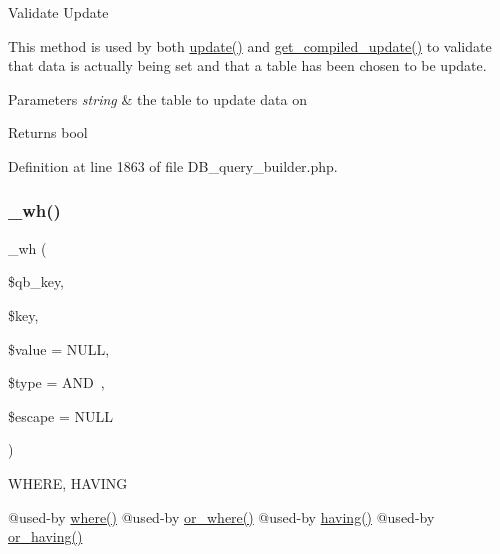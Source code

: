Validate Update

This method is used by both \mbox{\hyperlink{class_c_i___d_b__query__builder_a130a26da2dd4e4582ee18f42d71fe6e4}{update()}} and \mbox{\hyperlink{class_c_i___d_b__query__builder_a77fb150224714405067df7c300c317b0}{get\+\_\+compiled\+\_\+update()}} to validate that data is actually being set and that a table has been chosen to be update.


\begin{DoxyParams}{Parameters}
{\em string} & the table to update data on \\
\hline
\end{DoxyParams}
\begin{DoxyReturn}{Returns}
bool 
\end{DoxyReturn}


Definition at line 1863 of file D\+B\+\_\+query\+\_\+builder.\+php.

\mbox{\label{class_c_i___d_b__query__builder_a616af9ae6c40b3fe7074a8517207934f}} 
\subsubsection{\texorpdfstring{\_wh()}{\_wh()}}
{\footnotesize\ttfamily \+\_\+wh (\begin{DoxyParamCaption}\item[{}]{\$qb\+\_\+key,  }\item[{}]{\$key,  }\item[{}]{\$value = {\ttfamily NULL},  }\item[{}]{\$type = {\ttfamily \textquotesingle{}AND~\textquotesingle{}},  }\item[{}]{\$escape = {\ttfamily NULL} }\end{DoxyParamCaption})\hspace{0.3cm}{\ttfamily [protected]}}

W\+H\+E\+RE, H\+A\+V\+I\+NG

@used-\/by \mbox{\hyperlink{class_c_i___d_b__query__builder_a2356c4b7b93fb83c62a354a8a0748222}{where()}} @used-\/by \mbox{\hyperlink{class_c_i___d_b__query__builder_a8d25e93a09f60fbe77541d0faef29bf0}{or\+\_\+where()}} @used-\/by \mbox{\hyperlink{class_c_i___d_b__query__builder_af19efb51311e6f648a0035a0f94fceb6}{having()}} @used-\/by \mbox{\hyperlink{class_c_i___d_b__query__builder_a14528cda8dcca86ebb9b597d9c8d1c14}{or\+\_\+having()}}


